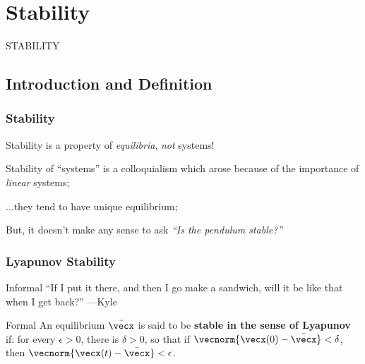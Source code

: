 \documentclass[12pt]{beamer}
\begin{document}
\section{Stability}


\begin{frame}
\vfill
\centering
{\Large STABILITY}
\vfill\null
\end{frame}



\subsection{Introduction and Definition}




\begin{frame}
\frametitle{Stability}

\begin{itemize}

\vitem Stability is a property of \emph{equilibria}, \emph{not} systems!

\vitem Stability of ``systems'' is a colloquialism which arose because of the importance of \emph{linear} systems;

\vitem ...they tend to have unique equilibrium;

\vitem But, it doesn't make any sense to ask \emph{``Is the pendulum stable?''}

\end{itemize}

\end{frame}




\begin{frame}
\frametitle{Lyapunov Stability}
\vfill
\begin{block}{Informal}
``If I put it there, and then I go make a sandwich, will it be like that when I get back?''
---Kyle
\end{block}

\vfill
\begin{block}{Formal}
An equilibrium $\bar\vecx$ is said to be \textbf{stable in the sense of Lyapunov} if:
for every $\epsilon > 0$, there is $\delta >0$, so that
if $\vecnorm{\vecx(0)-\bar\vecx} < \delta$, then
$\vecnorm{\vecx(t) - \bar\vecx} < \epsilon$. 
\end{block}

\vfill\null

\end{frame}
\end{document}
